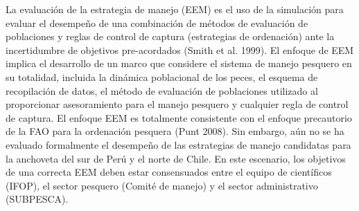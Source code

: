 La evaluación de la estrategia de manejo (EEM) es el uso de la simulación para evaluar el desempeño de una combinación de métodos de evaluación de poblaciones y reglas de control de captura (estrategias de ordenación) ante la incertidumbre de objetivos pre-acordados (Smith et al. 1999). El enfoque de EEM implica el desarrollo de un marco que considere el sistema de manejo pesquero en su totalidad, incluida la dinámica poblacional de los peces, el esquema de recopilación de datos, el método de evaluación de poblaciones utilizado al proporcionar asesoramiento para el manejo pesquero y cualquier regla de control de captura. El enfoque EEM es totalmente consistente con el enfoque precautorio de la FAO para la ordenación pesquera (Punt 2008). Sin embargo, aún no se ha evaluado formalmente el desempeño de las estrategias de manejo candidatas para la anchoveta del sur de Perú y el norte de Chile. En este escenario, los objetivos de una correcta EEM deben estar consensuados entre el equipo de científicos (IFOP), el sector pesquero (Comité de manejo) y el sector administrativo (SUBPESCA).

